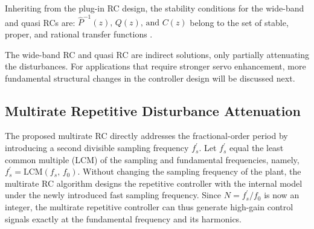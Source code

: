 \documentclass [11pt, proquest] {uwthesis}[2020/02/24]
\begin{document}
Inheriting from the plug-in RC design, the stability conditions for
the wide-band and quasi RCs are: $\hat{P}^{-1}(z),\,Q(z),\,\text{and }C(z)$
belong to the set of stable, proper, and rational transfer functions
\cite{XChen_ACC2013_tutorial}.

The wide-band RC and quasi RC are indirect solutions, only partially
attenuating the disturbances. For applications that require stronger
servo enhancement, more fundamental structural changes in the controller
design will be discussed next.

\subsection{Multirate Repetitive Disturbance Attenuation} \label{subsec:Multirate-RC}

The proposed multirate RC directly addresses the fractional-order
period by introducing a second divisible sampling frequency $f_{s}^{'}$.
Let $f_{s}^{'}$ equal the least common multiple (LCM) of the sampling
and fundamental frequencies, namely, $f_{s}^{'}=\text{LCM}(f_{s},\,f_{0})$.
Without changing the sampling frequency of the plant, the multirate
RC algorithm designs the repetitive controller with the internal
model under the newly introduced fast sampling frequency. Since $N=f_{s}^{'}/f_{0}$
is now an integer, the multirate repetitive controller can thus generate
high-gain control signals exactly at the fundamental frequency and
its harmonics.
\end{document}

